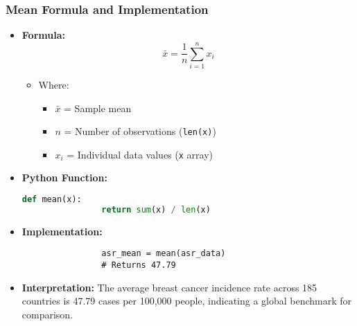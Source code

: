 \begin{frame}[fragile]
    \frametitle{Mean Formula and Implementation}
    \begin{itemize}
        \item \textbf{Formula:}
              \[
                  \bar{x} = \frac{1}{n} \sum_{i=1}^{n} x_i
              \]
              \begin{itemize}
                  \item Where:
                        \begin{itemize}
                            \item $\bar{x}$ = Sample mean
                            \item $n$ = Number of observations (\texttt{len(x)})
                            \item $x_i$ = Individual data values (\texttt{x} array)
                        \end{itemize}
              \end{itemize}

        \item \textbf{Python Function:}
              \begin{lstlisting}[language=Python, breaklines=true]
                def mean(x):
                return sum(x) / len(x)
            \end{lstlisting}

        \item \textbf{Implementation:}
              \begin{lstlisting}
                asr_mean = mean(asr_data)  
                # Returns 47.79
            \end{lstlisting}

        \item \textbf{Interpretation:} The average breast cancer incidence rate across 185 countries is 47.79 cases per 100,000 people, indicating a global benchmark for comparison.
    \end{itemize}
\end{frame}

